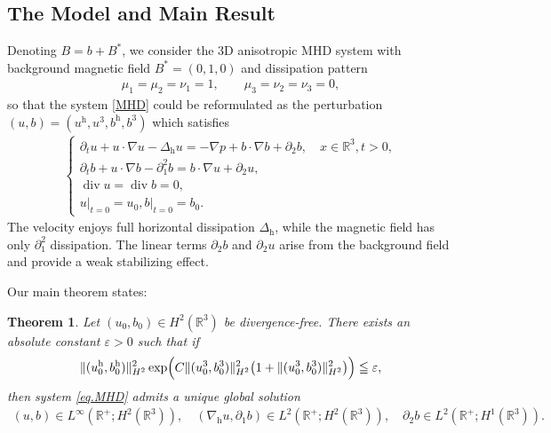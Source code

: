 \documentclass[11pt]{amsart}
\newtheorem{thm}{Theorem}[section]
\theoremstyle{definition}
\newcommand{\h}{\mathrm{h}}
\numberwithin{equation}{section}
\begin{document}
\subsection{The Model and Main Result}
Denoting $B=b+B^*$, we consider the 3D anisotropic MHD system with background magnetic field $B^*=(0,1,0)$ and dissipation pattern
\begin{align*}
	\mu_1=\mu_2=\nu_1=1,\qquad \mu_3=\nu_2=\nu_3=0,
\end{align*}
so that the system \eqref{MHD} could be reformulated as the perturbation $(u,b)=(u^\mathrm{h},u^3,b^\mathrm{h},b^3)$ which satisfies
\begin{align} \label{eq.MHD}
	\left\{\begin{array}{l}
		\displaystyle {\partial_t}u+u\cdot\nabla{u}-\Delta_\h u =-\nabla{p}+b\cdot\nabla{b}+\partial_2b,\quad x\in\mathbb{R}^3,t>0,\\
		\displaystyle {\partial_t}b+u\cdot\nabla{b}-\partial_1^2b =b\cdot\nabla{u}+\partial_2u,\\
		\displaystyle \operatorname{div}u=\operatorname{div}b=0,\\
		u{|_{t = 0}} =  {u_0},b{|_{t = 0}} =  {b_0}.
	\end{array}
	\right.
\end{align}
The velocity enjoys full horizontal dissipation $\Delta_\mathrm{h}$, while the magnetic field has only $\partial_1^2$ dissipation. The linear terms $\partial_2 b$ and $\partial_2 u$ arise from the background field and provide a weak stabilizing effect.

Our main theorem states:
\begin{thm}\label{main.Th}
	Let $(u_0,b_0)\in H^2(\mathbb{R}^3)$ be divergence-free. There exists an absolute constant $\varepsilon>0$ such that if
	\begin{align}\label{small}
		\|(u^\mathrm{h}_0,b^\mathrm{h}_0)\|_{H^2}^2
		\exp\Bigl(C\|(u^3_0,b^3_0)\|_{H^2}^2\bigl(1+\|(u^3_0,b^3_0)\|_{H^2}^2\bigr)\Bigr)\leqq\varepsilon,
	\end{align}
	then system \eqref{eq.MHD} admits a unique global solution
	\begin{align*}
		(u,b)\in L^\infty(\mathbb{R}^+;H^2(\mathbb{R}^3)),\quad
		(\nabla_\mathrm{h}u,\partial_1b)\in L^2(\mathbb{R}^+;H^2(\mathbb{R}^3)),\quad
		\partial_2b\in L^2(\mathbb{R}^+;H^1(\mathbb{R}^3)).
	\end{align*}
\end{thm}
\end{document}
